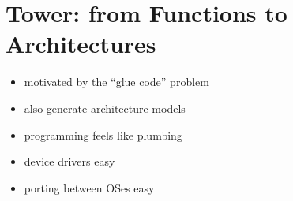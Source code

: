 \section{Tower: from Functions to Architectures}

\begin{itemize}
\item motivated by the ``glue code'' problem
\item also generate architecture models
\item programming feels like plumbing
\item device drivers easy
\item porting between OSes easy
\end{itemize}

